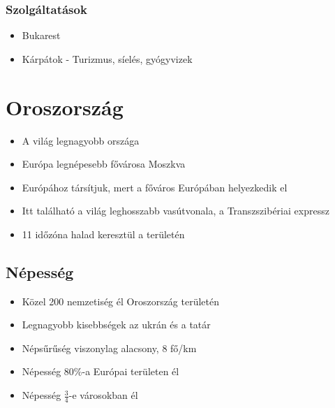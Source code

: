 \documentclass{article}
\begin{document}
\subsubsection{Szolgáltatások}
\begin{itemize}
    \item Bukarest
    \item Kárpátok - Turizmus, síelés, gyógyvizek
\end{itemize}

\section{Oroszország}
\begin{itemize}
    \item A világ legnagyobb országa
    \item Európa legnépesebb fővárosa Moszkva
    \item Európához társítjuk, mert a főváros Európában helyezkedik el
    \item Itt található a világ leghosszabb vasútvonala, a Transzszibériai expressz
    \item 11 időzóna halad keresztül a területén
\end{itemize}

\subsection{Népesség} 
\begin{itemize}
    \item Közel 200 nemzetiség él Oroszország területén
    \item Legnagyobb kisebbségek az ukrán és a tatár
    \item Népsűrűség viszonylag alacsony, 8 fő/km
    \item Népesség 80\%-a Európai területen él
    \item Népesség $\frac{3}{4}$-e városokban él
\end{itemize}
\end{document}
